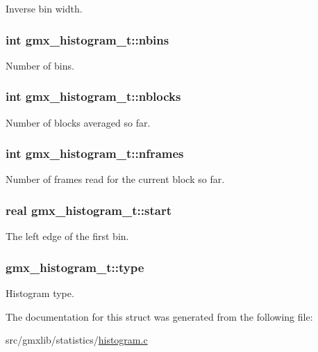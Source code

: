 \-Inverse bin width. \hypertarget{structgmx__histogram__t_a0382d677083c77e24f471fb418f0f8a9}{
\subsubsection[{nbins}]{\setlength{\rightskip}{0pt plus 5cm}int {\bf gmx\-\_\-histogram\-\_\-t\-::nbins}}}\label{structgmx__histogram__t_a0382d677083c77e24f471fb418f0f8a9}
\-Number of bins. \hypertarget{structgmx__histogram__t_a861f7eec38c8b7e0198d6e69614c350a}{
\subsubsection[{nblocks}]{\setlength{\rightskip}{0pt plus 5cm}int {\bf gmx\-\_\-histogram\-\_\-t\-::nblocks}}}\label{structgmx__histogram__t_a861f7eec38c8b7e0198d6e69614c350a}
\-Number of blocks averaged so far. \hypertarget{structgmx__histogram__t_aeca8377f09bce59c4140c39308b83c3f}{
\subsubsection[{nframes}]{\setlength{\rightskip}{0pt plus 5cm}int {\bf gmx\-\_\-histogram\-\_\-t\-::nframes}}}\label{structgmx__histogram__t_aeca8377f09bce59c4140c39308b83c3f}
\-Number of frames read for the current block so far. \hypertarget{structgmx__histogram__t_a20cc2acc8a203d8e26038d6e26172a3e}{
\subsubsection[{start}]{\setlength{\rightskip}{0pt plus 5cm}real {\bf gmx\-\_\-histogram\-\_\-t\-::start}}}\label{structgmx__histogram__t_a20cc2acc8a203d8e26038d6e26172a3e}
\-The left edge of the first bin. \hypertarget{structgmx__histogram__t_af3de4312dbc5e1f517aa871d743a810f}{
\subsubsection[{type}]{ {\bf gmx\-\_\-histogram\-\_\-t\-::type}}}\label{structgmx__histogram__t_af3de4312dbc5e1f517aa871d743a810f}
\-Histogram type. 

\-The documentation for this struct was generated from the following file\-:\begin{DoxyCompactItemize}
\item 
src/gmxlib/statistics/\hyperlink{histogram_8c}{histogram.\-c}\end{DoxyCompactItemize}
